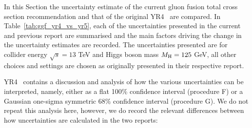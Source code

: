 In this Section the uncertainty estimate of the current gluon fusion total cross section recommendation and that of the original YR4~\cite{LHCHiggsCrossSectionWorkingGroup:2016ypw} are compared.
In Table~\ref{tab:ggf_yr4_vs_yr5}, each of the uncertainties presented in the current and previous report are summarised and the main factors driving the change in the uncertainty estimates are recorded.
The uncertainties presented are for collider energy $\sqrt{s} = 13$ TeV and Higgs boson mass $M_\mathrm{H} = 125$ GeV, all other choices and settings are chosen as originally presented in their respective report.

YR4~\cite{LHCHiggsCrossSectionWorkingGroup:2016ypw} contains a discussion and analysis of how the various uncertainties can be interpreted, namely, either as a flat 100\% confidence interval (procedure F) or a Gaussian one-sigma symmetric 68\% confidence interval (procedure G). 
We do not repeat this analysis here, however, we do record the relevant differences between how uncertainties are calculated in the two reports:
